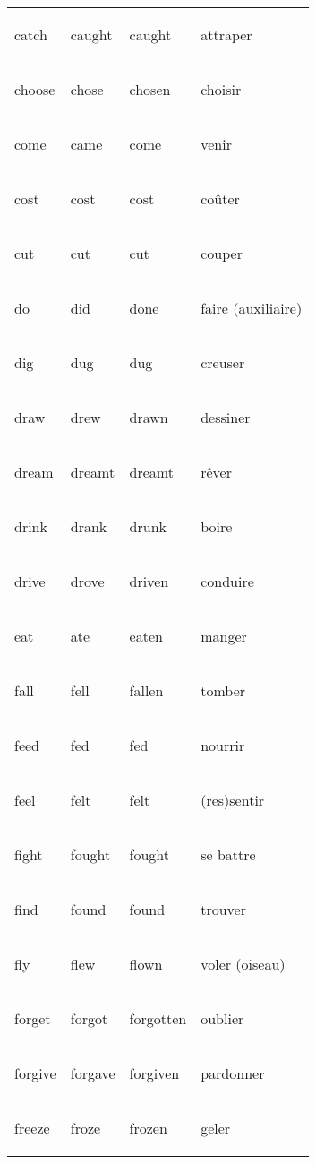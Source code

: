 \documentclass[
]{article}
\begin{document}
\begin{longtable}{>{\bfseries\raggedright\arraybackslash}p{3cm}ll>{\bfseries\raggedright\arraybackslash}p{3cm}}
catch & caught & caught & attraper\\

\rowcolor{gray!6}  choose & chose & chosen & choisir\\

come & came & come & venir\\

\rowcolor{gray!6}  cost & cost & cost & coûter\\

cut & cut & cut & couper\\

\rowcolor{gray!6}  do & did & done & faire (auxiliaire)\\

dig & dug & dug & creuser\\

\rowcolor{gray!6}  draw & drew & drawn & dessiner\\

dream & dreamt & dreamt & rêver\\

\rowcolor{gray!6}  drink & drank & drunk & boire\\

drive & drove & driven & conduire\\

\rowcolor{gray!6}  eat & ate & eaten & manger\\

fall & fell & fallen & tomber\\

\rowcolor{gray!6}  feed & fed & fed & nourrir\\

feel & felt & felt & (res)sentir\\

\rowcolor{gray!6}  fight & fought & fought & se battre\\

find & found & found & trouver\\

\rowcolor{gray!6}  fly & flew & flown & voler (oiseau)\\

forget & forgot & forgotten & oublier\\

\rowcolor{gray!6}  forgive & forgave & forgiven & pardonner\\

freeze & froze & frozen & geler\\


\end{longtable}
\end{document}
